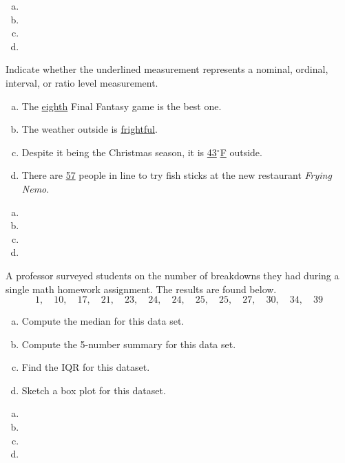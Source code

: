 \documentclass[12pt,letterpaper]{exam}
\begin{document}
\begin{questions}
\sol 
\begin{enumerate}[(a)]
\item 
\item 
\item 
\item 
\end{enumerate}



\newpage
\question[10] Indicate whether the underlined measurement represents a nominal, ordinal, interval, or ratio level measurement.
	\begin{enumerate}[(a)]
	\item The \underline{eighth} Final Fantasy game is the best one. 
	\item The weather outside is \underline{frightful}. 	
	\item Despite it being the Christmas season, it is \underline{43$^\circ$F} outside. 
	\item There are \underline{57} people in line to try fish sticks at the new restaurant \textit{Frying Nemo}. 
	\end{enumerate} \pspace

\sol 
\begin{enumerate}[(a)]
\item 
\item 
\item 
\item 
\end{enumerate}



\newpage
\question[10] A professor surveyed students on the number of breakdowns they had during a single math homework assignment. The results are found below. 
	\[
	1, \quad 10, \quad 17, \quad 21, \quad 23, \quad 24, \quad 24, \quad 25, \quad 25, \quad 27, \quad 30, \quad 34, \quad 39
	\]

\begin{enumerate}[(a)]
\item Compute the median for this data set. 
\item Compute the 5-number summary for this data set. 
\item Find the IQR for this dataset. 
\item Sketch a box plot for this dataset. 
\end{enumerate} \pspace

\sol 
\begin{enumerate}[(a)]
\item 
\item 
\item 
\item 
\end{enumerate}




\end{questions}
\end{document}
